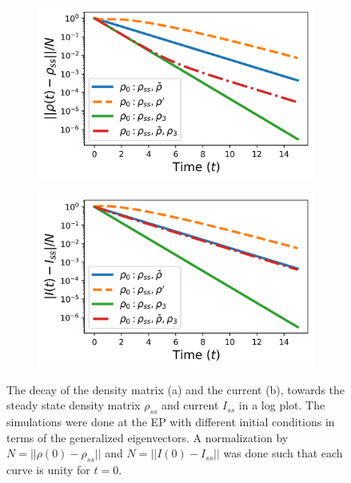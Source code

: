 \documentclass[../main.tex]{subfiles}
\begin{document}
\begin{figure}[H]
\centering
\begin{subfigure}[t]{.5\textwidth}
  \centering
  \includegraphics[width=\linewidth]{figures/rho_diff_rho0_v3.png}
  \caption{}
  \label{fig:rhodiffrho0}
\end{subfigure}%
\begin{subfigure}[t]{.5\textwidth}
  \centering
  \includegraphics[width=\linewidth]{figures/I_diff_rho0_nonvis.png}
  \caption{}
  \label{fig:Idiffrho0}
\end{subfigure}
\caption{The decay of the density matrix (a) and the current (b), towards the steady state density matrix $\rho_{ss}$ and current $I_{ss}$ in a log plot. The simulations were done at the EP with different initial conditions in terms of the generalized eigenvectors. A normalization by $N=||\rho(0) - \rho_{ss}||$ and $N=||I(0) - I_{ss}||$ was done such that each curve is unity for $t=0$.}
\label{fig:diffrho}
\end{figure}
\end{document}
